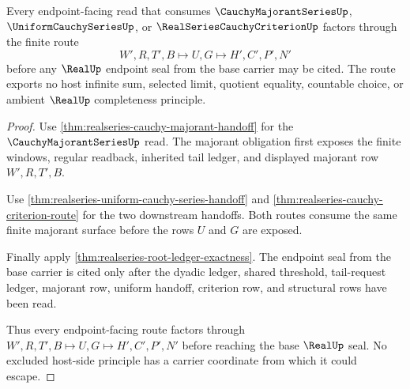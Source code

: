 \begin{theorem}
\label{thm:realseries-majorant-endpoint-nonescape}
Every endpoint-facing read that consumes $\CauchyMajorantSeriesUp$, $\UniformCauchySeriesUp$, or $\RealSeriesCauchyCriterionUp$ factors through the finite route
$$
W',R,T',B\longmapsto U,G\longmapsto H',C',P',N'
$$
before any $\RealUp$ endpoint seal from the base carrier may be cited. The route exports no host infinite sum, selected limit, quotient equality, countable choice, or ambient $\RealUp$ completeness principle.
\end{theorem}
\begin{proof}
Use \autoref{thm:realseries-cauchy-majorant-handoff} for the $\CauchyMajorantSeriesUp$ read. The majorant obligation first exposes the finite windows, regular readback, inherited tail ledger, and displayed majorant row $W',R,T',B$.

Use \autoref{thm:realseries-uniform-cauchy-series-handoff} and \autoref{thm:realseries-cauchy-criterion-route} for the two downstream handoffs. Both routes consume the same finite majorant surface before the rows $U$ and $G$ are exposed.

Finally apply \autoref{thm:realseries-root-ledger-exactness}. The endpoint seal from the base carrier is cited only after the dyadic ledger, shared threshold, tail-request ledger, majorant row, uniform handoff, criterion row, and structural rows have been read.

Thus every endpoint-facing route factors through $W',R,T',B\longmapsto U,G\longmapsto H',C',P',N'$ before reaching the base $\RealUp$ seal. No excluded host-side principle has a carrier coordinate from which it could escape.
\end{proof}

